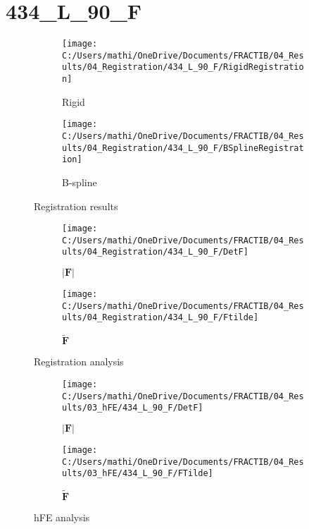 \documentclass{article}%
\begin{document}
%
\newpage%
\section*{434\_L\_90\_F}%
\label{sec:434L90F}%


\begin{figure}[h!]%
\begin{subfigure}[b]{0.5\linewidth}%
\texttt{[image: C:/Users/mathi/OneDrive/Documents/FRACTIB/04\_Results/04\_Registration/434\_L\_90\_F/RigidRegistration]}%
\caption{Rigid}%
\end{subfigure}%
\begin{subfigure}[b]{0.5\linewidth}%
\texttt{[image: C:/Users/mathi/OneDrive/Documents/FRACTIB/04\_Results/04\_Registration/434\_L\_90\_F/BSplineRegistration]}%
\caption{B{-}spline}%
\end{subfigure}%
\caption{Registration results}%
\end{figure}

%


\begin{figure}[h!]%
\begin{subfigure}[b]{0.5\linewidth}%
\texttt{[image: C:/Users/mathi/OneDrive/Documents/FRACTIB/04\_Results/04\_Registration/434\_L\_90\_F/DetF]}%
\caption{$|\mathbf{F}|$}%
\end{subfigure}%
\begin{subfigure}[b]{0.5\linewidth}%
\texttt{[image: C:/Users/mathi/OneDrive/Documents/FRACTIB/04\_Results/04\_Registration/434\_L\_90\_F/Ftilde]}%
\caption{$\tilde{\mathbf{F}}$}%
\end{subfigure}%
\caption{Registration analysis}%
\end{figure}

%


\begin{figure}[h!]%
\begin{subfigure}[b]{0.5\linewidth}%
\texttt{[image: C:/Users/mathi/OneDrive/Documents/FRACTIB/04\_Results/03\_hFE/434\_L\_90\_F/DetF]}%
\caption{$|\mathbf{F}|$}%
\end{subfigure}%
\begin{subfigure}[b]{0.5\linewidth}%
\texttt{[image: C:/Users/mathi/OneDrive/Documents/FRACTIB/04\_Results/03\_hFE/434\_L\_90\_F/FTilde]}%
\caption{$\tilde{\mathbf{F}}$}%
\end{subfigure}%
\caption{hFE analysis}%
\end{figure}
\end{document}
